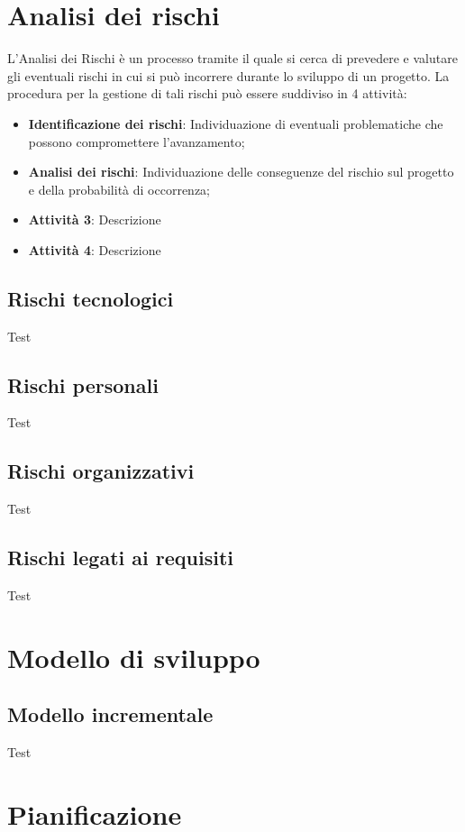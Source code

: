 \documentclass[12pt, a4paper]{article}
\begin{document}
    \section{Analisi dei rischi}
    L'Analisi dei Rischi è un processo tramite il quale si cerca di prevedere e valutare gli eventuali rischi in cui si può
    incorrere durante lo sviluppo di un progetto. La procedura per la gestione di tali rischi può essere suddiviso in 4 attività:
    \begin{itemize}
        \item \textbf{Identificazione dei rischi}: Individuazione di eventuali problematiche che possono compromettere l'avanzamento;
        \item \textbf{Analisi dei rischi}: Individuazione delle conseguenze del rischio sul progetto e della probabilità di occorrenza;
        \item \textbf{Attività 3}: Descrizione
        \item \textbf{Attività 4}: Descrizione
    \end{itemize}

    \subsection{Rischi tecnologici}
    Test

    \subsection{Rischi personali}
    Test

    \subsection{Rischi organizzativi}
    Test

    \subsection{Rischi legati ai requisiti}
    Test

    \section{Modello di sviluppo}
    \subsection{Modello incrementale} %
    Test

    \section{Pianificazione}

    
\end{document}
